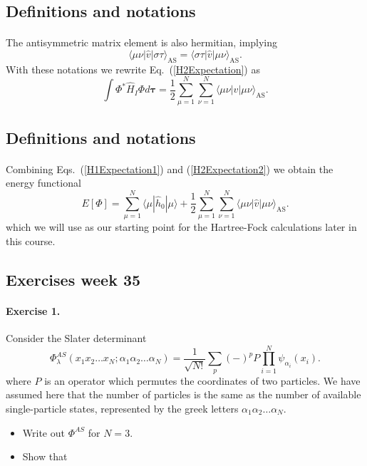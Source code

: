 \documentclass[%
twoside,                 %
final,                   %
10pt]{article}
\begin{document}
\subsection{Definitions and notations}

\paragraph{}
The antisymmetric matrix element is also hermitian, implying 
\[
\langle \mu\nu|\hat{v}|\sigma\tau\rangle_{\mathrm{AS}}= \langle \sigma\tau|\hat{v}|\mu\nu\rangle_{\mathrm{AS}}.
\]
With these notations we rewrite Eq.~(\ref{H2Expectation}) as 
\begin{equation}
  \int \Phi^*\hat{H}_I\Phi d\mathbf{\tau} 
  = \frac{1}{2}\sum_{\mu=1}^N\sum_{\nu=1}^N \langle \mu\nu|\hat{v}|\mu\nu\rangle_{\mathrm{AS}}.
\label{H2Expectation2}
\end{equation}



\subsection{Definitions and notations}

\paragraph{}
Combining Eqs.~(\ref{H1Expectation1}) and
(\ref{H2Expectation2}) we obtain the energy functional 
\begin{equation}
  E[\Phi] 
  = \sum_{\mu=1}^N \langle \mu | \hat{h}_0 | \mu \rangle +
  \frac{1}{2}\sum_{{\mu}=1}^N\sum_{{\nu}=1}^N \langle \mu\nu|\hat{v}|\mu\nu\rangle_{\mathrm{AS}}.
\label{FunctionalEPhi}
\end{equation}
which we will use as our starting point for the Hartree-Fock calculations later in this course.



\subsection{Exercises week 35}

\paragraph{Exercise 1.}
Consider the Slater determinant
\[
\Phi_{\lambda}^{AS}(x_{1}x_{2}\dots x_{N};\alpha_{1}\alpha_{2}\dots\alpha_{N})
=\frac{1}{\sqrt{N!}}\sum_{p}(-)^{p}P\prod_{i=1}^{N}\psi_{\alpha_{i}}(x_{i}).
\]
where $P$ is an operator which permutes the coordinates of two particles. We have assumed here that the 
number of particles is the same as the number of available single-particle states, represented by the
greek letters $\alpha_{1}\alpha_{2}\dots\alpha_{N}$.
\begin{itemize}
\item Write  out $\Phi^{AS}$ for $N=3$.  

\item Show that
\end{itemize}
\end{document}
